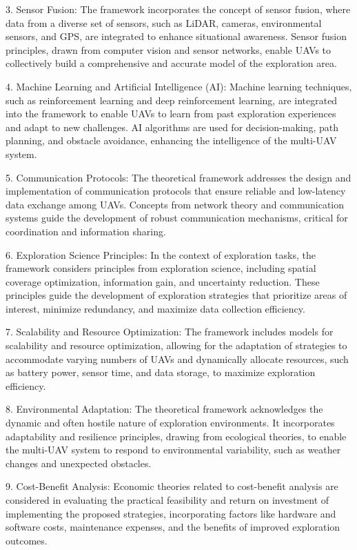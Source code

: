 \documentclass[sigconf]{acmart}
\begin{document}
3. Sensor Fusion: The framework incorporates the concept of sensor fusion, where data from a diverse set of sensors, such as LiDAR, cameras, environmental sensors, and GPS, are integrated to enhance situational awareness. Sensor fusion principles, drawn from computer vision and sensor networks, enable UAVs to collectively build a comprehensive and accurate model of the exploration area.

4. Machine Learning and Artificial Intelligence (AI): Machine learning techniques, such as reinforcement learning and deep reinforcement learning, are integrated into the framework to enable UAVs to learn from past exploration experiences and adapt to new challenges. AI algorithms are used for decision-making, path planning, and obstacle avoidance, enhancing the intelligence of the multi-UAV system.

5. Communication Protocols: The theoretical framework addresses the design and implementation of communication protocols that ensure reliable and low-latency data exchange among UAVs. Concepts from network theory and communication systems guide the development of robust communication mechanisms, critical for coordination and information sharing.

6. Exploration Science Principles: In the context of exploration tasks, the framework considers principles from exploration science, including spatial coverage optimization, information gain, and uncertainty reduction. These principles guide the development of exploration strategies that prioritize areas of interest, minimize redundancy, and maximize data collection efficiency.

7. Scalability and Resource Optimization: The framework includes models for scalability and resource optimization, allowing for the adaptation of strategies to accommodate varying numbers of UAVs and dynamically allocate resources, such as battery power, sensor time, and data storage, to maximize exploration efficiency.

8. Environmental Adaptation: The theoretical framework acknowledges the dynamic and often hostile nature of exploration environments. It incorporates adaptability and resilience principles, drawing from ecological theories, to enable the multi-UAV system to respond to environmental variability, such as weather changes and unexpected obstacles.

9. Cost-Benefit Analysis: Economic theories related to cost-benefit analysis are considered in evaluating the practical feasibility and return on investment of implementing the proposed strategies, incorporating factors like hardware and software costs, maintenance expenses, and the benefits of improved exploration outcomes.
\end{document}
